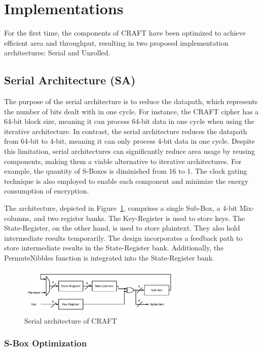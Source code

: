 \documentclass[final,5p,times,twocolumn]{elsarticle}
\begin{document}
\section{Implementations}\label{sec3}

For the first time, the components of CRAFT have been optimized to achieve efficient area and throughput, resulting in two proposed implementation architectures: Serial and Unrolled.


\subsection{Serial Architecture (SA)}\label{subsec2}
The purpose of the serial architecture is to reduce the datapath, which represents the number of bits dealt with in one cycle. For instance, the CRAFT cipher has a 64-bit block size, meaning it can process 64-bit data in one cycle when using the iterative architecture. In contrast, the serial architecture reduces the datapath from 64-bit to 4-bit, meaning it can only process 4-bit data in one cycle. Despite this limitation, serial architectures can significantly reduce area usage by reusing components, making them a viable alternative to iterative architectures.
For example, the quantity of S-Boxes is diminished from 16 to 1.
The clock gating technique is also employed to enable each component and minimize the energy consumption of encryption.

The architecture, depicted in Figure~\ref{fig3}, comprises a single Sub-Box, a 4-bit Mix-columns, and two register banks.
The Key-Register is used to store keys. The State-Register, on the other hand, is used to store plaintext.
They also hold intermediate results temporarily.
The design incorporates a feedback path to store intermediate results in the State-Register bank.
Additionally, the PermuteNibbles function is integrated into the State-Register bank.


\begin{figure}[h]%
    \centering
    \includegraphics[width=0.7\textwidth]{./serial-archticture.pdf}
    \caption{Serial architecture of CRAFT}\label{fig3}
\end{figure}


\subsubsection{S-Box Optimization }\label{subsubsec1}
\end{document}

